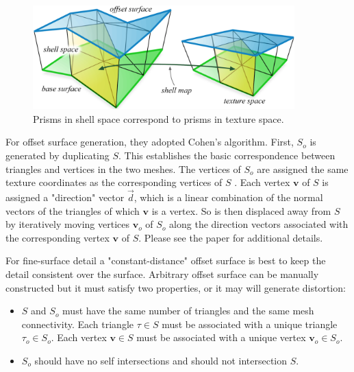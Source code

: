 \begin{figure}\label{f:prisms}
	\begin{center}
		\includegraphics[width=0.9\textwidth]{graphics/df/shell-maps-2}	
	\end{center}	
	\caption{Prisms in shell space correspond to prisms in texture space.}
\end{figure}

For offset surface generation, they adopted Cohen's algorithm\cite[-19mm]{a:SimplificationEnvelopes}. First, $S_{o}$ is generated by duplicating $S$. This establishes the basic correspondence between triangles and vertices in the two meshes. The vertices of $S_{o}$  are assigned the same texture coordinates as the corresponding vertices of $S$ . Each vertex $\mathbf{v}$ of $S$ is assigned a "direction" vector $\vec{d}$, which is a linear combination of the normal vectors of the triangles of which $\mathbf{v}$ is a vertex. So is then displaced away from $S$ by iteratively moving vertices $\mathbf{v}_{o}$ of $S_{o}$ along the direction vectors associated with the corresponding vertex $\mathbf{v}$ of $S$. Please see the paper for additional details. 

For fine-surface detail a "constant-distance" offset surface is best to keep the detail consistent over the surface. Arbitrary offset surface can be manually constructed but it must satisfy two properties, or it may will generate distortion:

\begin{itemize}
	\item $S$ and $S_{o}$ must have the same number of triangles and the same mesh connectivity. Each triangle $\tau\in S$ must be associated with a unique triangle $\tau_{o}\in S_{o}$. Each vertex $\mathbf{v}\in S$ must be associated with a unique vertex $\mathbf{v}_{o}\in S_{o}$.
	\item $S_{o}$ should have no self intersections and should not intersection $S$.
\end{itemize}

